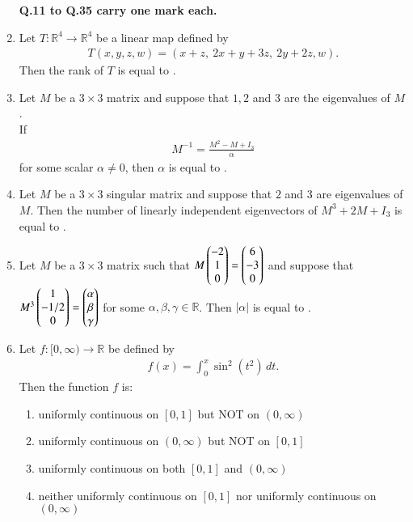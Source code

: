 \documentclass[journal]{IEEEtran}
\numberwithin{equation}{enumi}
\numberwithin{figure}{enumi}
\begin{document}
\begin{enumerate}
\textbf{Q.11 to Q.35 carry one mark each.}


\item Let $T: \mathbb{R}^4 \to \mathbb{R}^4$ be a linear map defined by  \hfill{}
\begin{align*}
T(x, y, z, w) = (x + z,\ 2x + y + 3z,\ 2y + 2z, w).
\end{align*}
Then the rank of $T$ is equal to \underline{\hspace{2cm}}.
\vspace{1em}

\item Let $M$ be a $3 \times 3$ matrix and suppose that $1, 2$ and $3$ are the eigenvalues of $M$. \\
If  \hfill{}
\begin{align*}
M^{-1} = \frac{M^2 - M + I_3}{\alpha}
\end{align*}
for some scalar $\alpha \neq 0$, then $\alpha$ is equal to \underline{\hspace{2cm}}.
\vspace{1em}

\item Let $M$ be a $3 \times 3$ singular matrix and suppose that $2$ and $3$ are eigenvalues of $M$. Then the number of linearly independent eigenvectors of $M^3 + 2M + I_3$ is equal to \underline{\hspace{2cm}}. \hfill{}
\vspace{1em}

\item Let $M$ be a $3 \times 3$ matrix such that $M \begin{pmatrix} -2 \\ 1 \\ 0 \end{pmatrix} = \begin{pmatrix} 6 \\ -3 \\ 0 \end{pmatrix}$ and suppose that $M^3 \begin{pmatrix} 1 \\ -1/2 \\ 0 \end{pmatrix} = \begin{pmatrix} \alpha \\ \beta \\ \gamma \end{pmatrix}$ for some $\alpha, \beta, \gamma \in \mathbb{R}$. Then $|\alpha|$ is equal to \underline{\hspace{2cm}}.
\hfill{}
\vspace{1em}

\item Let \( f: [0, \infty) \to \mathbb{R} \) be defined by
\begin{align*}
f(x) = \int_0^x \sin^2(t^2)\,dt.
\end{align*}
Then the function \( f \) is:  \hfill{}
\begin{enumerate}
    \item uniformly continuous on \([0, 1]\) but NOT on \((0, \infty)\)
    \item uniformly continuous on \((0, \infty)\) but NOT on \([0, 1]\)
    \item uniformly continuous on both \([0, 1]\) and \((0, \infty)\)
    \item neither uniformly continuous on \([0,1]\) nor uniformly continuous on \((0, \infty)\)
\end{enumerate}



\end{enumerate}
\end{document}
